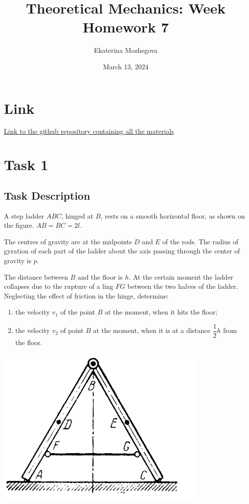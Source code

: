 \documentclass{article}
\title{Theoretical Mechanics: Week Homework 7}
\author{Ekaterina Mozhegova}
\date{March 13, 2024}
\begin{document}
\maketitle

\section{Link}
\href{https://github.com/illusoryTwin/Theoretical_mechanics/tree/master/hw7}{Link to the github repository containing all the materials}

\section{Task 1}

\subsection{Task Description}

A step ladder $ABC$, hinged at $B$, rests on a smooth horizontal floor, as shown on the figure. $AB=BC=2l$.

The centres of gravity are at the midpoints $D$ and $E$ of the rods. The radius of gyration of each part of the ladder about the axis passing through the center of gravity is $p$.

The distance between $B$ and the floor is $h$. At the certain moment the ladder collapses due to the rupture of a ling $FG$ between the two halves of the ladder. Neglecting the effect of friction in the hinge, determine:
\begin{enumerate}
  \item the velocity $v_1$ of the point $B$ at the moment, when it hits the floor;
  \item the velocity $v_2$ of point $B$ at the moment, when it is at a distance $\dfrac{1}{2}h$ from the floor.
\end{enumerate}

\includegraphics*[scale=0.5]{task_scheme/hw7_task1.png}{\centering}
\end{document}
